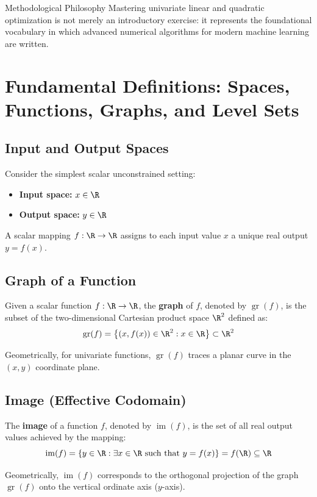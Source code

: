\begin{noteblock}{Methodological Philosophy}
Mastering univariate linear and quadratic optimization is not merely an introductory exercise: it represents the foundational vocabulary in which advanced numerical algorithms for modern machine learning are written.
\end{noteblock}


\FloatBarrier
\section{Fundamental Definitions: Spaces, Functions, Graphs, and Level Sets}
\label{sec:opt-fundamental-definitions}

\subsection{Input and Output Spaces}
Consider the simplest scalar unconstrained setting:
\begin{itemize}
    \item \textbf{Input space:} $x \in \R$
    \item \textbf{Output space:} $y \in \R$
\end{itemize}
A scalar mapping $f: \R \to \R$ assigns to each input value $x$ a unique real output $y = f(x)$.

\subsection{Graph of a Function}
\begin{definition}[Graph]
Given a scalar function $f: \R \to \R$, the \textbf{graph} of $f$, denoted by $\operatorname{gr}(f)$, is the subset of the two-dimensional Cartesian product space $\R^2$ defined as:
\begin{equation}
\operatorname{gr}(f) = \left\{ (x, f(x)) \in \R^2 : x \in \R \right\} \subset \R^2
\end{equation}
\end{definition}
Geometrically, for univariate functions, $\operatorname{gr}(f)$ traces a planar curve in the $(x, y)$ coordinate plane.

\subsection{Image (Effective Codomain)}
\begin{definition}[Image]
The \textbf{image} of a function $f$, denoted by $\operatorname{im}(f)$, is the set of all real output values achieved by the mapping:
\begin{equation}
\operatorname{im}(f) = \left\{ y \in \R : \exists x \in \R \text{ such that } y = f(x) \right\} = f(\R) \subseteq \R
\end{equation}
\end{definition}
Geometrically, $\operatorname{im}(f)$ corresponds to the orthogonal projection of the graph $\operatorname{gr}(f)$ onto the vertical ordinate axis ($y$-axis).

